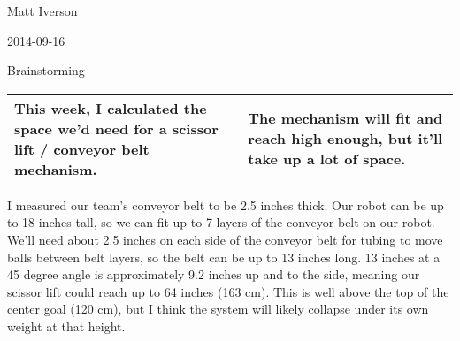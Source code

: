 Matt Iverson

2014-09-16

Brainstorming

\begin{tabular}{|p{5cm}|p{5cm}|}
 \hline
 This week, I calculated the space we’d need for a scissor lift / conveyor belt mechanism. &
 The mechanism will fit and reach high enough, but it’ll take up a lot of space. \\
 \hline
\end{tabular}

I measured our team’s conveyor belt to be 2.5 inches thick.
Our robot can be up to 18 inches tall, so we can fit up to 7 layers of the conveyor belt on our robot.
We’ll need about 2.5 inches on each side of the conveyor belt for tubing to move balls between belt layers, so the belt can be up to 13 inches long.
13 inches at a 45 degree angle is approximately 9.2 inches up and to the side, meaning our scissor lift could reach up to 64 inches (163 cm).
This is well above the top of the center goal (120 cm), but I think the system will likely collapse under its own weight at that height.

